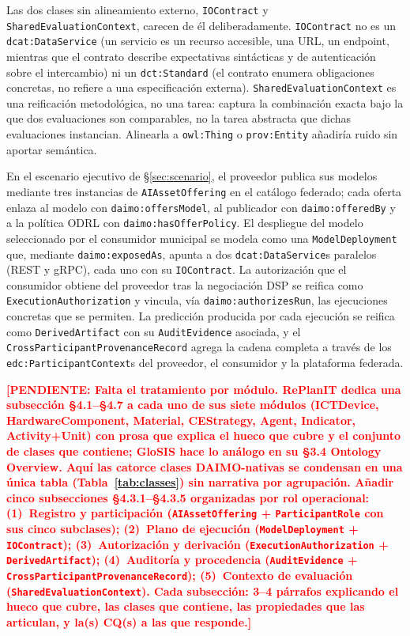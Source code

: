 \documentclass[11pt,a4paper]{article}
\newcommand{\code}[1]{\texttt{#1}}
\newcommand{\TODO}[1]{\textcolor{red}{\textbf{[PENDIENTE: #1]}}}
\begin{document}
Las dos clases sin alineamiento externo, \code{IOContract} y \code{SharedEvaluationContext}, carecen de él deliberadamente. \code{IOContract} no es un \code{dcat:DataService} (un servicio es un recurso accesible, una URL, un endpoint, mientras que el contrato describe expectativas sintácticas y de autenticación sobre el intercambio) ni un \code{dct:Standard} (el contrato enumera obligaciones concretas, no refiere a una especificación externa). \code{SharedEvaluationContext} es una reificación metodológica, no una tarea: captura la combinación exacta bajo la que dos evaluaciones son comparables, no la tarea abstracta que dichas evaluaciones instancian. Alinearla a \code{owl:Thing} o \code{prov:Entity} añadiría ruido sin aportar semántica.

En el escenario ejecutivo de §\ref{sec:scenario}, el proveedor publica sus modelos mediante tres instancias de \code{AIAssetOffering} en el catálogo federado; cada oferta enlaza al modelo con \code{daimo:offersModel}, al publicador con \code{daimo:offeredBy} y a la política ODRL con \code{daimo:hasOfferPolicy}. El despliegue del modelo seleccionado por el consumidor municipal se modela como una \code{ModelDeployment} que, mediante \code{daimo:exposedAs}, apunta a dos \code{dcat:DataService}s paralelos (REST y gRPC), cada uno con su \code{IOContract}. La autorización que el consumidor obtiene del proveedor tras la negociación DSP se reifica como \code{ExecutionAuthorization} y vincula, vía \code{daimo:authorizesRun}, las ejecuciones concretas que se permiten. La predicción producida por cada ejecución se reifica como \code{DerivedArtifact} con su \code{AuditEvidence} asociada, y el \code{CrossParticipantProvenanceRecord} agrega la cadena completa a través de los \code{edc:ParticipantContext}s del proveedor, el consumidor y la plataforma federada.

\TODO{Falta el tratamiento por módulo. RePlanIT dedica una subsección \S4.1--\S4.7 a cada uno de sus siete módulos (ICTDevice, HardwareComponent, Material, CEStrategy, Agent, Indicator, Activity+Unit) con prosa que explica el hueco que cubre y el conjunto de clases que contiene; GloSIS hace lo análogo en su \S3.4 Ontology Overview. Aquí las catorce clases DAIMO-nativas se condensan en una única tabla (Tabla~\ref{tab:classes}) sin narrativa por agrupación. Añadir cinco subsecciones \S4.3.1--\S4.3.5 organizadas por rol operacional: (1)~Registro y participación (\code{AIAssetOffering} + \code{ParticipantRole} con sus cinco subclases); (2)~Plano de ejecución (\code{ModelDeployment} + \code{IOContract}); (3)~Autorización y derivación (\code{ExecutionAuthorization} + \code{DerivedArtifact}); (4)~Auditoría y procedencia (\code{AuditEvidence} + \code{CrossParticipantProvenanceRecord}); (5)~Contexto de evaluación (\code{SharedEvaluationContext}). Cada subsección: 3--4 párrafos explicando el hueco que cubre, las clases que contiene, las propiedades que las articulan, y la(s) CQ(s) a las que responde.}
\end{document}
